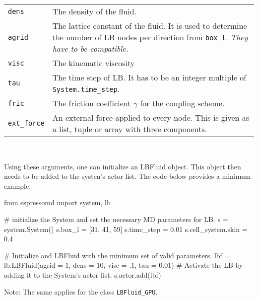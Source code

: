 \vspace{0,2cm}
\begin{tabular}{p{}p{}}
\texttt{dens} & The density of the fluid.\\
\texttt{agrid} & The lattice constant of the fluid. It is used to determine the number of LB nodes 
per direction from \texttt{box\_l}. {\em They have to be compatible.} \\
\texttt{visc} & The kinematic viscosity \\
  \texttt{tau} & The time step of LB. It has to be an integer multiple of
  \texttt{System.time\_step}. \\
\texttt{fric} & The friction coefficient $\gamma$ for the coupling scheme. \\
\texttt{ext\_force} & An external force applied to every node. This is given as
a list, tuple or array with three components.%
\end{tabular}\\ 
\vspace{0,2cm}

Using these arguments, one can initialize an LBFluid object. This object then
needs to be added to the systen's actor list. The code below provides a minimum
example.
\vspace{0,2cm}
\begin{pypresso}
  from espressomd import system, lb

  # initialize the System and set the necessary MD parameters for LB.
  s = system.System()
  s.box_l = [31, 41, 59]
  s.time_step = 0.01
  s.cell_system.skin = 0.4

  # Initialize and LBFluid with the minimum set of valid parameters.
  lbf = lb.LBFluid(agrid = 1, dens = 10, visc = .1, tau = 0.01)
  # Activate the LB by adding it to the System's actor list.
  s.actor.add(lbf)
\end{pypresso}
\vspace{0,2cm}
Note: The same applies for the class \texttt{LBFluid\_GPU}.

